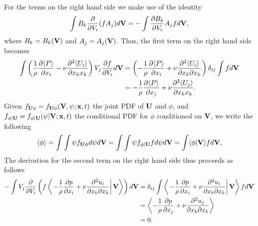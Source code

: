 \documentclass[oneside,a4paper,11pt]{report}
\begin{document}
For the terms on the right hand side we make use of the identity
\begin{equation}
\int B_k \frac{\partial}{\partial V_i} ( f A_j ) d\mathbf{V} = - \int \frac{\partial B_k}{\partial V_i} A_j f d\mathbf{V},
\end{equation}
where $B_k = B_k(\mathbf{V})$ and $A_j = A_j(\mathbf{V})$.
Thus, the first term on the right hand side becomes
\begin{align}
\int \left ( \frac{1}{\rho} \frac{\partial \langle P \rangle}{\partial x_i} -\nu \frac{\partial^2 \langle U_i \rangle}{\partial x_k x_k} \right) V_j \frac{\partial f}{\partial V_i} d\mathbf{V} & = \left (- \frac{1}{\rho} \frac{\partial \langle P \rangle}{\partial x_i} + \nu \frac{\partial^2 \langle U_i \rangle}{\partial x_k \partial x_k} \right) \delta_{ij} \int f d\mathbf{V} \nonumber \\
& = -\frac{1}{\rho} \frac{\partial \langle P \rangle}{\partial x_j} + \nu \frac{\partial ^2 \langle U_j \rangle}{\partial x_k x_k}.
\end{align}
Given $f_{\mathbf{U} \phi} = f_{\mathbf{U} \phi}(\mathbf{V}, \psi; \mathbf{x}, t)$ the joint PDF of $\mathbf{U}$ and $\phi$, and $f_{\phi | \mathbf{U}} = f_{\phi | \mathbf{U}}(\psi | \mathbf{V}; \mathbf{x}, t)$ the conditional PDF for $\phi$ conditioned on $\mathbf{V}$, we write the following 
\begin{equation}
\langle \phi \rangle = \int \int \psi f_{\mathbf{U} \phi} d\psi d\mathbf{V} = \int \int \psi f_{\phi | \mathbf{U}} f d\psi d\mathbf{V} = \int \langle \phi | \mathbf{V} \rangle f d\mathbf{V},
\end{equation}
The derivation for the second term on the right hand side thus proceeds as follows
\begin{align}
-\int V_j \frac{\partial}{\partial V_i} \left ( f \left < \left . - \frac{1}{\rho} \frac{\partial p}{\partial x_i} + \nu \frac{\partial^2 u_i}{\partial x_k \partial x_k} \right | \mathbf{V} \right > \right ) d\mathbf{V} &= \delta_{ij} \int \left < \left . - \frac{1}{\rho} \frac{\partial p}{\partial x_i} + \nu \frac{\partial^2 u_i}{\partial x_k \partial x_k} \right | \mathbf{V} \right > f d\mathbf{V} \nonumber \\
& = \left < - \frac{1}{\rho} \frac{\partial p}{\partial x_j} + \nu \frac{\partial^2 u_j}{\partial x_k \partial x_k} \right > \nonumber \\
& = 0.
\end{align}
\end{document}
